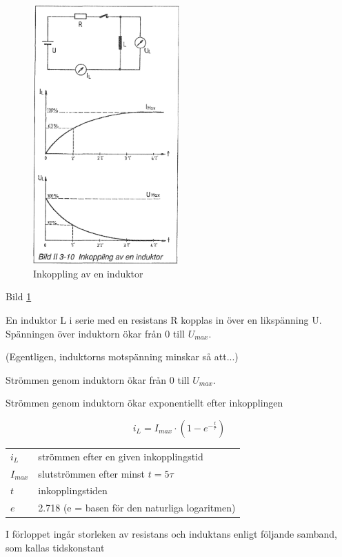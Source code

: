 \begin{figure}
\includegraphics[width=0.5\textwidth]{images/bild_2_3-10}
\caption{Inkoppling av en induktor}
\label{fig:BildII3-10}
\end{figure}

Bild \ref{fig:BildII3-10}

En induktor L i serie med en resistans R kopplas in över en likspänning U.
Spänningen över induktorn ökar från 0 till \(U_{max}\).

(Egentligen, induktorns motspänning minskar så att...)

Strömmen genom induktorn ökar från 0 till \(U_{max}\).

Strömmen genom induktorn ökar exponentiellt efter inkopplingen

\[i_L = I_{max} \cdot (1-e^{-\frac{t}{\tau}} )\]

\begin{tabular}{lp{}}
  \(i_L\) &  strömmen efter en given inkopplingstid \\
  \(I_{max}\) & slutströmmen efter minst \(t = 5\tau\) \\
  \(t\) & inkopplingstiden \\
  \(e\) & 2.718 (e = basen för den naturliga logaritmen) \\
\end{tabular}

I förloppet ingår storleken av resistans och induktans enligt följande samband,
som kallas tidskonstant

